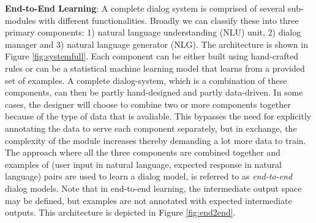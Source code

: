 \noindent\textbf{End-to-End Learning}: A complete dialog system is comprised of several sub-modules with different functionalities. Broadly we can classify these into three primary components: 1) natural language understanding (NLU) unit, 2) dialog manager and 3) natural language generator (NLG). The architecture is shown in Figure \ref{fig:systemfull}. Each component can be either built using hand-crafted rules or can be a statistical machine learning model that learns from a provided set of examples. A complete dialog-system, which is a combination of these components, can then be partly hand-designed and partly data-driven. In some cases, the designer will choose to combine two or more components together because of the type of data that is avaliable. This bypasses the need for explicitly annotating the data to serve each component separately, but in exchange, the complexity of the module increases thereby demanding a lot more data to train. The approach where all the three components are combined together and examples of (user input in natural language, expected response in natural language) pairs are used to learn a dialog model, is referred to as \textit{end-to-end} dialog models. Note that in end-to-end learning, the intermediate output space may be defined, but examples are not annotated with expected intermediate outputs. This architecture is depicted in Figure \ref{fig:end2end}.

